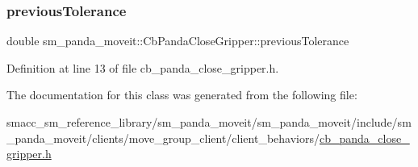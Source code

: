 \subsubsection{\texorpdfstring{previous\+Tolerance}{previousTolerance}}
{\footnotesize\ttfamily double sm\+\_\+panda\+\_\+moveit\+::\+Cb\+Panda\+Close\+Gripper\+::previous\+Tolerance\hspace{0.3cm}{\ttfamily [private]}}



Definition at line 13 of file cb\+\_\+panda\+\_\+close\+\_\+gripper.\+h.



The documentation for this class was generated from the following file\+:\begin{DoxyCompactItemize}
\item 
smacc\+\_\+sm\+\_\+reference\+\_\+library/sm\+\_\+panda\+\_\+moveit/sm\+\_\+panda\+\_\+moveit/include/sm\+\_\+panda\+\_\+moveit/clients/move\+\_\+group\+\_\+client/client\+\_\+behaviors/\hyperlink{cb__panda__close__gripper_8h}{cb\+\_\+panda\+\_\+close\+\_\+gripper.\+h}\end{DoxyCompactItemize}
